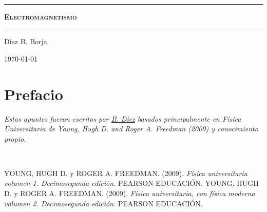 \documentclass[letterpaper, onecolumn, 11pt]{report}
\begin{document}
\sffamily
\begin{center}

\

\vspace{6.5cm}

\rule{15cm}{0.1cm}

\vspace{1.5cm}

{\huge \textsc{\textbf{Electromagnetismo}}}

\vspace{1.5cm}

\rule{15cm}{0.1cm}

\vspace{1.5cm}
Diez B. Borja

\today

\newpage
\setcounter{page}{1}

\pagestyle{plain}
\chapter*{Prefacio}
\bigskip
\bigskip
\bigskip
\bigskip
\bigskip
\bigskip


\emph{Estos apuntes fueron escritos por \href{https://github.com/10BlackHole}{B. Diez} basados principalmente en Física Universitaria de Young, Hugh D. and Roger A. Freedman (2009) y conocimiento propio.}
\bigskip


\bigskip

\newpage
\end{center}
\\
\tableofcontents
{}
\setcounter{page}{1}







%


\appendix


\newpage
\begin{thebibliography}{}
YOUNG, HUGH D. y ROGER A. FREEDMAN. (2009). \textit{Física universitaria volumen 1. Decimosegunda edición}. PEARSON EDUCACIÓN.
 YOUNG, HUGH D. y ROGER A. FREEDMAN. (2009). \textit{Física universitaria, con física moderna volumen 2.
Decimosegunda edición}. PEARSON EDUCACIÓN.

\end{thebibliography}
\end{document}

